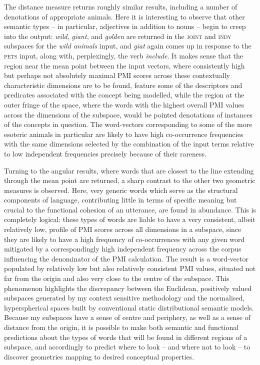 The distance measure returns roughly similar results, including a number of denotations of appropriate animals.  Here it is interesting to observe that other semantic types -- in particular, adjectives in addition to nouns -- begin to creep into the output: \emph{wild}, \emph{giant}, and \emph{golden} are returned in the \textsc{joint} and \textsc{indy} subspaces for the \emph{wild animals} input, and \emph{giat} again comes up in response to the \textsc{pets} input, along with, perplexingly, the verb \emph{include}.  It makes sense that the region near the mean point between the input vectors, where consistently high but perhaps not absolutely maximal PMI scores across these contextually characteristic dimensions are to be found, feature some of the descriptors and predicates associated with the concept being modelled, while the region at the outer fringe of the space, where the words with the highest overall PMI values across the dimensions of the subspace, would be pointed denotations of instances of the concepts in question.  The word-vectors corresponding to some of the more esoteric animals in particular are likely to have high co-occurrence frequencies with the same dimensions selected by the combination of the input terms relative to low independent frequencies precisely because of their rareness.

Turning to the angular results, where words that are closest to the line extending through the mean point are returned, a sharp contrast to the other two geometric measures is observed.  Here, very generic words which serve as the structural components of language, contributing little in terms of specific meaning but crucial to the functional cohesion of an utterance, are found in abundance.  This is completely logical: these types of words are liable to have a very consistent, albeit relatively low, profile of PMI scores across all dimensions in a subspace, since they are likely to have a high frequency of co-occurrences with any given word mitigated by a correspondingly high independent frequency across the corpus influencing the denominator of the PMI calculation.  The result is a word-vector populated by relatively low but also relatively consistent PMI values, situated not far from the origin and also very close to the centre of the subspace.  This phenomenon highlights the discrepancy between the Euclidean, positively valued subspaces generated by my context sensitive methodology and the normalised, hyperspherical spaces built by conventional static distributional semantic models.  Because my subspaces have a sense of centre and periphery, as well as a sense of distance from the origin, it is possible to make both semantic and functional predictions about the types of words that will be found in different regions of a subspace, and accordingly to predict where to look -- and where not to look -- to discover geometries mapping to desired conceptual properties.

